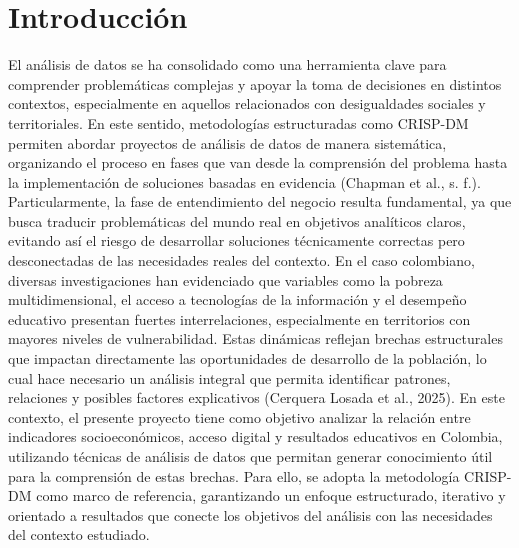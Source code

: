 \section{Introducción}
El análisis de datos se ha consolidado como una herramienta clave para comprender problemáticas complejas y apoyar la toma de decisiones en distintos contextos, especialmente en aquellos relacionados con desigualdades sociales y territoriales. En este sentido, metodologías estructuradas como CRISP-DM permiten abordar proyectos de análisis de datos de manera sistemática, organizando el proceso en fases que van desde la comprensión del problema hasta la implementación de soluciones basadas en evidencia (Chapman et al., s. f.).
Particularmente, la fase de entendimiento del negocio resulta fundamental, ya que busca traducir problemáticas del mundo real en objetivos analíticos claros, evitando así el riesgo de desarrollar soluciones técnicamente correctas pero desconectadas de las necesidades reales del contexto.
En el caso colombiano, diversas investigaciones han evidenciado que variables como la pobreza multidimensional, el acceso a tecnologías de la información y el desempeño educativo presentan fuertes interrelaciones, especialmente en territorios con mayores niveles de vulnerabilidad. Estas dinámicas reflejan brechas estructurales que impactan directamente las oportunidades de desarrollo de la población, lo cual hace necesario un análisis integral que permita identificar patrones, relaciones y posibles factores explicativos (Cerquera Losada et al., 2025).
En este contexto, el presente proyecto tiene como objetivo analizar la relación entre indicadores socioeconómicos, acceso digital y resultados educativos en Colombia, utilizando técnicas de análisis de datos que permitan generar conocimiento útil para la comprensión de estas brechas. Para ello, se adopta la metodología CRISP-DM como marco de referencia, garantizando un enfoque estructurado, iterativo y orientado a resultados que conecte los objetivos del análisis con las necesidades del contexto estudiado.